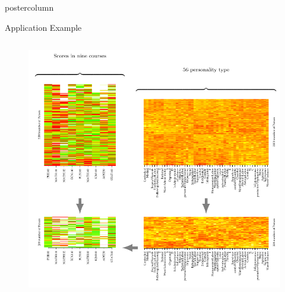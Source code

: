 \documentclass[9pt, final]{beamer}\usepackage[]{graphicx}\usepackage[]{color}
\begin{document}
\begin{frame}[fragile]
\begin{columns}
\begin{column}{\textwidth}
\begin{beamercolorbox}[center, wd=\textwidth]{postercolumn}
\begin{minipage}[T]{0.98\textwidth}
{\begin{block}{Application Example}
\begin{columns}[T, onlytextwidth]
\begin{column}{0.62\textwidth}
\begin{figure}
\includegraphics[width = \textwidth]{figure/application}
\end{figure}
\end{column}
\end{columns}
\end{block}
}
\end{minipage}
\end{beamercolorbox}
\end{column}
\end{columns}
\end{frame}
\end{document}
